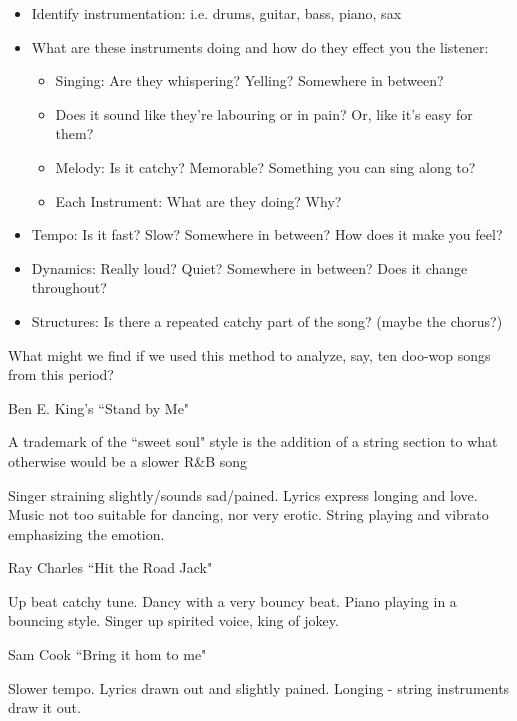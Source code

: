 \documentclass[12pt, a4paper, twoside, openright, titlepage]{book}
\begin{document}
\begin{itemize}
    \item Identify instrumentation: i.e. drums, guitar, bass, piano, sax
    \item What are these instruments doing and how do they effect you the listener: \begin{itemize}
            \item Singing: Are they whispering? Yelling? Somewhere in between?
            \item Does it sound like they're labouring or in pain? Or, like it's easy for them?
            \item Melody: Is it catchy? Memorable? Something you can sing along to?
            \item Each Instrument: What are they doing? Why?
    \end{itemize}
    \item Tempo: Is it fast? Slow? Somewhere in between? How does it make you feel?
    \item Dynamics: Really loud? Quiet? Somewhere in between? Does it change throughout?
    \item Structures: Is there a repeated catchy part of the song? (maybe the chorus?)
\end{itemize}

\begin{qst}{}{}
    What might we find if we used this method to analyze, say, ten doo-wop songs from this period?
\end{qst}

\begin{eg}{}{}
    Ben E. King's ``Stand by Me" 
    \begin{note}{}{}
        A trademark of the ``sweet soul" style is the addition of a string section to what otherwise would be a slower R\&B song
    \end{note}
    Singer straining slightly/sounds sad/pained. Lyrics express longing and love. Music not too suitable for dancing, nor very erotic. String playing and vibrato emphasizing the emotion.
\end{eg}

\begin{eg}{}{}
    Ray Charles ``Hit the Road Jack"

    Up beat catchy tune. Dancy with a very bouncy beat. Piano playing in a bouncing style. Singer up spirited voice, king of jokey.
\end{eg}

\begin{eg}{}{}
    Sam Cook ``Bring it hom to me"

    Slower tempo. Lyrics drawn out and slightly pained. Longing - string instruments draw it out.
\end{eg}
\end{document}
